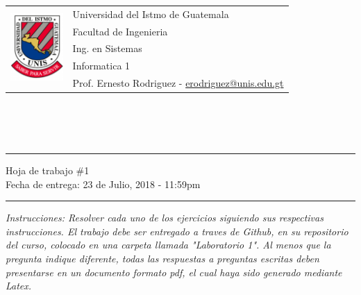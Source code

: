 \documentclass{article}
\newcommand{\horrule}[1]{\rule{\linewidth}{#1}}
\newcommand{\perlscript}[2]{
\begin{itemize}
\item[]
\end{itemize}
}
\begin{document}
\begin{tabular}{l l}
\multirow{5}{*}{\includegraphics[width=2cm]{../../recursos/logo.png}} & Universidad del Istmo de Guatemala \\
 & Facultad de Ingenieria \\
 & Ing. en Sistemas \\
 & Informatica 1 \\
 & Prof. Ernesto Rodriguez - \href{mailto:erodriguez@unis.edu.gt}{erodriguez@unis.edu.gt} \\
\end{tabular}
\\\\\\

\begin{center}
        \horrule{0.5pt}
        \huge{Hoja de trabajo \#1} \\
        \large{Fecha de entrega: 23 de Julio, 2018 - 11:59pm} \\
        \horrule{1pt}
\end{center}

\emph{Instrucciones: Resolver cada uno de los ejercicios siguiendo sus respectivas
instrucciones. El trabajo debe ser entregado a traves de Github, en su repositorio del curso, colocado en una carpeta llamada "Laboratorio 1".
Al menos que la pregunta indique diferente, todas las respuestas a preguntas escritas deben presentarse en
un documento formato pdf, el cual haya sido generado mediante Latex. }

\end{document}
